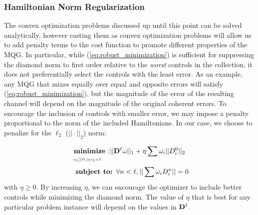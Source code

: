 \documentclass[aps,nofootinbib,pra,notitlepage,twocolumn]{revtex4-1}
\begin{document}


\subsubsection{Hamiltonian Norm Regularization}
\label{sec:norm}
The convex optimization problems discussed up until this point can be solved analytically, however casting them as convex optimization problems will allow us to add penalty terms to the cost function to promote different properties of the MQG. In particular, while (\ref{eq:robust_minimization}) is sufficient for suppressing the diamond norm to first order relative to the \textit{worst} controls in the collection, it does not preferentially select the controls with the least error. As an example, any MQG that mixes equally over equal and opposite errors will satisfy (\ref{eq:robust_minimization}), but the magnitude of the error of the resulting channel will depend on the magnitude of the original coherent errors. To encourage the inclusion of controls with smaller error, we may impose a penalty proportional to the norm of the included Hamiltonians. In our case, we choose to penalize for the $\ell_2$ ($||\cdot||_2$) norm:

\newcommand{\bunderbrace}[2]{%
  \begin{array}[t]{@{}c@{}}
  #1\\
  \parbox{\widthof{#1}}{$\scriptscriptstyle#2$}
  \end{array}
}

\begin{equation}\label{eq:minimization_l2}
\begin{split}
& \ \bunderbrace{\textbf{minimize}: }{\omega_i\geq0, |\omega|_1=1} ||{\bold{D}^{\ell}}\omega||_1+ \eta\sum\omega_i||D^0_i||_2\\
&\ \ \textbf{subject to: } \forall n<\ell, ||\sum \omega_iD_i^n||=0\\
\end{split}
\end{equation}
with $\eta \geq 0$. By increasing $\eta$, we can encourage the optimizer to include better controls while minimizing the diamond norm. The value of $\eta$ that is best for any particular problem instance will depend on the values in $\bold{D}^\ell$.
\end{document}
